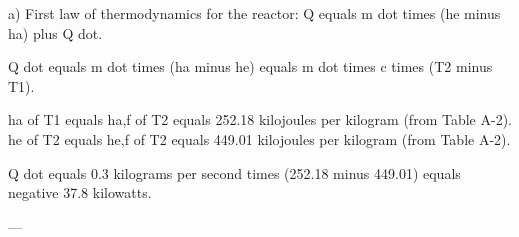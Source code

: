 a) First law of thermodynamics for the reactor:  
Q equals m dot times (he minus ha) plus Q dot.  

Q dot equals m dot times (ha minus he) equals m dot times c times (T2 minus T1).  

ha of T1 equals ha,f of T2 equals 252.18 kilojoules per kilogram (from Table A-2).  
he of T2 equals he,f of T2 equals 449.01 kilojoules per kilogram (from Table A-2).  

Q dot equals 0.3 kilograms per second times (252.18 minus 449.01) equals negative 37.8 kilowatts.  

---